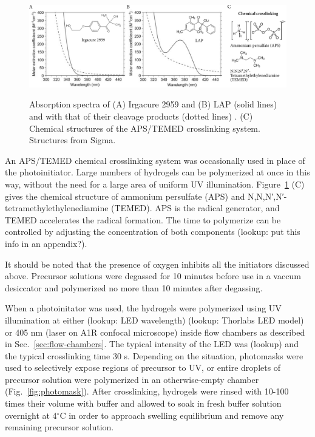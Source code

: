 \begin{figure}
\caption{Absorption spectra of (A) Irgacure 2959 and (B) LAP (solid lines) and with that of their cleavage products (dotted lines) \cite{fairbanks09}. (C) Chemical structures of the APS/TEMED crosslinking system. Structures from Sigma.}
\centering
\includegraphics[width=\textwidth]{figs/ch03/initiators}
\label{fig:initiators}
\end{figure}

An APS/TEMED chemical crosslinking system was occasionally used in place of the photoinitiator.  Large numbers of hydrogels can be polymerized at once in this way, without the need for a large area of uniform UV illumination.  Figure~\ref{fig:initiators} (C) gives the chemical structure of ammonium persulfate (APS) and N,N,N′,N′-tetramethylethylenediamine (TEMED).  APS is the radical generator, and TEMED accelerates the radical formation.  The time to polymerize can be controlled by adjusting the concentration of both components (lookup: put this info in an appendix?).

It should be noted that the presence of oxygen inhibits all the initiators discussed above.  Precursor solutions were degassed for 10 minutes before use in a vaccum desiccator and polymerized no more than 10 minutes after degassing.

When a photoinitator was used, the hydrogels were polymerized using UV illumination at either (lookup: LED wavelength) (lookup: Thorlabs LED model) or 405 nm (laser on A1R confocal microscope) inside flow chambers as described in Sec.~\ref{sec:flow-chambers}.  The typical intensity of the LED was (lookup) and the typical crosslinking time 30 s.  Depending on the situation, photomasks were used to selectively expose regions of precursor to UV, or entire droplets of precursor solution were polymerized in an otherwise-empty chamber (Fig.~\ref{fig:photomask}).  After crosslinking, hydrogels were rinsed with 10-100 times their volume with buffer and allowed to soak in fresh buffer solution overnight at 4$^\circ$C in order to approach swelling equilibrium and remove any remaining precursor solution.

